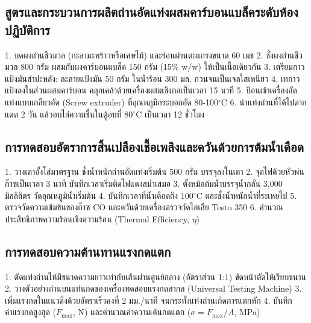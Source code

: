 \subsection{สูตรและกระบวนการผลิตถ่านอัดแท่งผสมคาร์บอนแบล็คระดับห้องปฏิบัติการ}
\begin{conceptbox}
1. บดผงถ่านชีวมวล (กะลามะพร้าวหรือเศษไม้) และร่อนผ่านตะแกรงขนาด 60 เมช
2. ชั่งผงถ่านชีวมวล 800 กรัม ผสมกับผงคาร์บอนแบล็ค 150 กรัม (15\% w/w) ให้เป็นเนื้อเดียวกัน
3. เตรียมกาวแป้งมันสำปะหลัง: ละลายแป้งมัน 50 กรัม ในน้ำร้อน 300 มล. กวนจนเป็นเจลใสเหนียว
4. เทกาวแป้งลงในส่วนผสมคาร์บอน คลุกเคล้าด้วยเครื่องผสมเชิงกลเป็นเวลา 15 นาที
5. ป้อนเข้าเครื่องอัดแท่งแบบเกลียวอัด (Screw extruder) ที่อุณหภูมิกระบอกอัด 80-100$^{\circ}$C
6. นำแท่งถ่านที่ได้ไปตากแดด 2 วัน แล้วอบไล่ความชื้นในตู้อบที่ 80$^{\circ}$C เป็นเวลา 12 ชั่วโมง
\end{conceptbox}

\subsection{การทดสอบอัตราการสิ้นเปลืองเชื้อเพลิงและควันด้วยการต้มน้ำเดือด}
\begin{conceptbox}
1. วางเตาอั้งโล่มาตรฐาน ชั่งน้ำหนักถ่านอัดแท่งเริ่มต้น 500 กรัม บรรจุลงในเตา
2. จุดไฟด้วยหัวพ่นก๊าซเป็นเวลา 3 นาที บันทึกเวลาเริ่มติดไฟแดงสม่ำเสมอ
3. ตั้งหม้อต้มน้ำบรรจุน้ำกลั่น 3,000 มิลลิลิตร วัดอุณหภูมิน้ำเริ่มต้น
4. บันทึกเวลาที่น้ำเดือดถึง 100$^{\circ}$C และชั่งน้ำหนักน้ำที่ระเหยไป
5. ตรวจวัดความเข้มข้นของก๊าซ CO และควันด้วยเครื่องตรวจวัดไอเสีย Testo 350
6. คำนวณประสิทธิภาพความร้อนเชิงความร้อน (Thermal Efficiency, $\eta$)
\end{conceptbox}

\subsection{การทดสอบความต้านทานแรงกดแตก}
\begin{conceptbox}
1. ตัดแท่งถ่านให้มีขนาดความยาวเท่ากับเส้นผ่านศูนย์กลาง (อัตราส่วน 1:1) ขัดหน้าตัดให้เรียบขนาน
2. วางตัวอย่างถ่านบนแท่นกดของเครื่องทดสอบแรงกดสากล (Universal Testing Machine)
3. เพิ่มแรงกดในแนวดิ่งด้วยอัตราเร็วคงที่ 2 มม./นาที จนกระทั่งแท่งถ่านเกิดการแตกหัก
4. บันทึกค่าแรงกดสูงสุด ($F_{\max}$, N) และคำนวณค่าความเค้นกดแตก ($\sigma = F_{\max} / A$, MPa)
\end{conceptbox}

